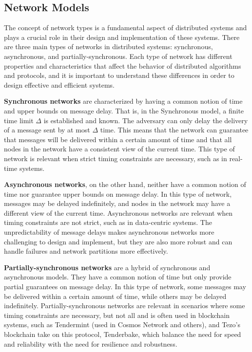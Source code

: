 \subsection*{\textbf{Network Models}}

The concept of network types is a fundamental aspect of distributed systems and plays a crucial role in their design and implementation of these systems. There are three main types of networks in distributed systems: synchronous, asynchronous, and partially-synchronous. Each type of network has different properties and characteristics that affect the behavior of distributed algorithms and protocols, and it is important to understand these differences in order to design effective and efficient systems.

\textbf{Synchronous networks} are characterized by having a common notion of time and upper bounds on message delay. 
That is, in the Synchronous model, a finite time limit $\Delta$ is established and known. The adversary can only delay the delivery of a message sent by at most $\Delta$ time.
This means that the network can guarantee that messages will be delivered within a certain amount of time and that all nodes in the network have a consistent view of the current time. This type of network is relevant when strict timing constraints are necessary, such as in real-time systems.

\textbf{Asynchronous networks}, on the other hand, neither have a common notion of time nor guarantee upper bounds on message delay. 
In this type of network, messages may be delayed indefinitely, and nodes in the network may have a different view of the current time. Asynchronous networks are relevant when timing constraints are not strict, such as in data-centric systems. The unpredictability of message delays makes asynchronous networks more challenging to design and implement, but they are also more robust and can handle failures and network partitions more effectively.

\textbf{Partially-synchronous networks} are a hybrid of synchronous and asynchronous models.
They have a common notion of time but only provide partial guarantees on message delay. In this type of network, some messages may be delivered within a certain amount of time, while others may be delayed indefinitely. Partially-synchronous networks are relevant in scenarios where some timing constraints are necessary, but not all and is often used in blockchain systems, such as Tendermint (used in Cosmos Network and others), and Tezo's blockchain take on this protocol, Tenderbake, which balance the need for speed and reliability with the need for resilience and robustness.

